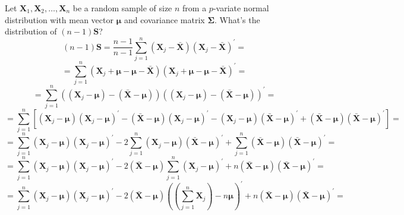 \documentclass{article}
\begin{document}
Let $\textbf{X}_{1}, \textbf{X}_{2}, \dots, \textbf{X}_{n}$ be a random sample of size $n$ from a $p$-variate normal distribution with mean vector $\bm{\mu}$ and covariance matrix $\bm{\Sigma}$. What's the distribution of $(n-1)\textbf{S}$?
    \[
        (n-1)\textbf{S}
        =
        \frac{n-1}{n -1}
        \sum_{j=1}^{n}{
            \left(\textbf{X}_{j} - \bar{\textbf{X}}\right)
            {\left(\textbf{X}_{j} - \bar{\textbf{X}}\right)}^{\prime}
        }
        =
    \]
    \[
        =
        \sum_{j=1}^{n}{
            \left(\textbf{X}_{j} + \bm{\mu} - \bm{\mu} - \bar{\textbf{X}}\right)
            {\left(\textbf{X}_{j} + \bm{\mu} - \bm{\mu} - \bar{\textbf{X}}\right)}^{\prime}
        }
        =
    \]
    \[
        =
        \sum_{j=1}^{n}{
            \left((\textbf{X}_{j} - \bm{\mu}) - (\bar{\textbf{X}} - \bm{\mu})\right)
            {\left((\textbf{X}_{j} - \bm{\mu}) - (\bar{\textbf{X}} - \bm{\mu})\right)}^{\prime}
        }
        =
    \]
    \[
        =
        \scriptstyle{
        \sum_{j=1}^{n}{
            \left[
            (\textbf{X}_{j} - \bm{\mu}){(\textbf{X}_{j} - \bm{\mu})}^{\prime}
            -
            (\bar{\textbf{X}} - \bm{\mu}){(\textbf{X}_{j} - \bm{\mu})}^{\prime}
            -
            (\textbf{X}_{j} - \bm{\mu}){(\bar{\textbf{X}} - \bm{\mu})}^{\prime}
            +
            (\bar{\textbf{X}} - \bm{\mu}){(\bar{\textbf{X}} - \bm{\mu})}^{\prime}
            \right]
        }
        }
        =
    \]
    \[
        =
        \scriptstyle{
        \sum_{j=1}^{n}{
            (\textbf{X}_{j} - \bm{\mu}){(\textbf{X}_{j} - \bm{\mu})}^{\prime}
        }
        -
        2
        \sum_{j=1}^{n}{
            (\textbf{X}_{j} - \bm{\mu}){(\bar{\textbf{X}} - \bm{\mu})}^{\prime}
        }
        +
        \sum_{j=1}^{n}{
            (\bar{\textbf{X}} - \bm{\mu}){(\bar{\textbf{X}} - \bm{\mu})}^{\prime}
        }
        }
        =
    \]
    \[
        =
        \scriptstyle{
        \sum_{j=1}^{n}{
            (\textbf{X}_{j} - \bm{\mu}){(\textbf{X}_{j} - \bm{\mu})}^{\prime}
        }
        -
        2
        (\bar{\textbf{X}} - \bm{\mu})
        \sum_{j=1}^{n}{
            {(\textbf{X}_{j} - \bm{\mu})}^{\prime}
        }
        +
        n
        (\bar{\textbf{X}} - \bm{\mu}){(\bar{\textbf{X}} - \bm{\mu})}^{\prime}
        }
        =
    \]
    \[
        =
        \scriptstyle{
        \sum_{j=1}^{n}{
            (\textbf{X}_{j} - \bm{\mu}){(\textbf{X}_{j} - \bm{\mu})}^{\prime}
        }
        -
        2
        (\bar{\textbf{X}} - \bm{\mu})
        {((\sum_{j=1}^{n}{\textbf{X}_{j}}) - n\bm{\mu})}^{\prime}
        +
        n
        (\bar{\textbf{X}} - \bm{\mu}){(\bar{\textbf{X}} - \bm{\mu})}^{\prime}
        }
        =
    \]
\end{document}
